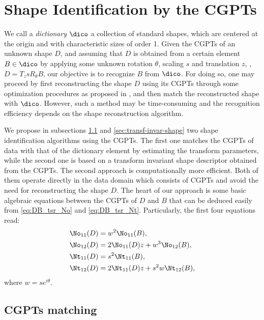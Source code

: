 \section{Shape Identification by the CGPTs}\label{sec:shape-ident-cgpt}

We call a \emph{dictionary} $\dico$  a collection of standard
shapes, which are centered at the origin and with characteristic
sizes of order 1. Given the CGPTs of an unknown shape $D$, and
assuming that $D$ is obtained from a certain element $B\in\dico$
by applying some unknown rotation $\theta$, scaling $s$ and
translation $z$, \ie, $D=T_zsR_\theta B$, our objective is to
recognize $B$ from $\dico$. For doing so, one may proceed by first
reconstructing the shape $D$ using its CGPTs through some
optimization procedures as proposed in \cite{ammari2010conductivity}, and then
match the reconstructed shape with $\dico$. However, such a method
may be time-consuming and the recognition efficiency depends on
the shape reconstruction algorithm.

We propose in subsections \ref{sec:cgpt-matching} and
\ref{sec:transf-invar-shape} two shape identification algorithms
using the CGPTs. The first one matches the CGPTs of data with that
of the dictionary element by estimating the transform parameters,
while the second one is based on a transform invariant shape
descriptor obtained from the CGPTs. The second approach is
computationally more efficient. Both of them operate directly in
the data domain which consists of CGPTs and avoid the need for
reconstructing the shape $D$. The heart of our approach is some
basic algebraic equations between the CGPTs of $D$ and $B$ that
can be deduced easily from \eqref{eq:DB_tsr_No} and
\eqref{eq:DB_tsr_Nt}. Particularly, the first four equations read:
\begin{align}
  \No_{11}(D) &= w^2 \No_{11}(B), \label{eq:No11}\\
  \No_{12}(D) &= 2\No_{11}(D)z + w^3 \No_{12}(B), \label{eq:No12}\\
  \Nt_{11}(D) &= s^2 \Nt_{11}(B),\label{eq:Nt11}\\
  \Nt_{12}(D) &= 2\Nt_{11}(D)z + s^2w\Nt_{12}(B),\label{eq:Nt12}
\end{align}
where $w=s e^{i \theta}$.

\subsection{CGPTs matching}
\label{sec:cgpt-matching}

